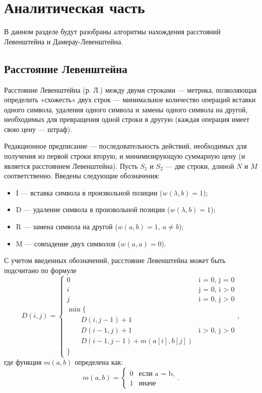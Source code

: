 \chapter{Аналитическая часть}

В данном разделе будут разобраны алгоритмы нахождения расстояний Левенштейна и Дамерау-Левенштейна.

\section{Расстояние Левенштейна}

Расстояние Левенштейна (р. Л.) между двумя строками --- метрика, позволяющая определить «схожесть» двух строк --- минимальное количество операций вставки одного символа, удаления одного символа и замены одного символа на другой, необходимых для превращения одной строки в другую (каждая операция имеет свою цену --- штраф). 

Редакционное предписание --- последовательность действий, необходимых для получения из первой строки вторую, и минимизирующую суммарную цену (и является расстоянием Левенштейна).
Пусть $S_{1}$ и $S_{2}$ --- две строки, длиной $N$ и $M$ соответственно. 
Введены следующие обозначения:
\begin{itemize}
	\item I --- вставка символа в произвольной позиции ($w(\lambda,b)=1$);
	\item D --- удаление символа в произвольной позиции ($w(\lambda,b)=1$);
	\item R --- замена символа на другой ($w(a,b)=1, \medspace a \neq b$);
	\item M --- совпадение двух символов ($w(a,a)=0$).
\end{itemize}
С учетом введенных обозначений, расстояние Левенштейна может быть подсчитано по формуле
\begin{equation}
	\label{eq:D}
	D(i, j) = \begin{cases}
		0 &\text{i = 0, j = 0}\\
		i &\text{j = 0, i > 0}\\
		j &\text{i = 0, j > 0}\\
		\min \lbrace \\
		\qquad D(i, j-1) + 1\\
		\qquad D(i-1, j) + 1 &\text{i > 0, j > 0}\\
		\qquad D(i-1, j-1) + m(a[i], b[j]) \\
		\rbrace
	\end{cases},
\end{equation}
где функция $m(a, b)$ определена как:
\begin{equation}
	\label{eq:m}
	m(a, b) = \begin{cases}
		0 &\text{если a = b,}\\
		1 &\text{иначе}
	\end{cases}.
\end{equation}

